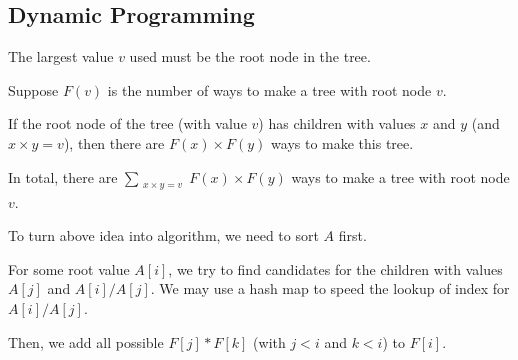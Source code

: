 \subsection{Dynamic Programming}
The largest value $v$ used must be the root node in the tree. 

Suppose $F(v)$ is the number of ways to make a tree with root node $v$.

If the root node of the tree (with value $v$) has children with values $x$ and $y$ (and $x \times y = v$), then there are $F(x) \times F(y)$ ways to make this tree.

In total, there are $\sum_{\substack{x \times y = v}} F(x) \times F(y)$ ways to make a tree with root node $v$.


To turn above idea into algorithm, we need to sort $A$ first.

For some root value $A[i]$, we try to find candidates for the children with values $A[j]$ and $A[i] / A[j]$. We may use a hash map to speed the lookup of index for $A[i]/A[j]$.

Then, we add all possible $F[j] * F[k]$ (with $j < i$ and $k < i$) to $F[i]$. 

\setcounter{lstlisting}{0}

